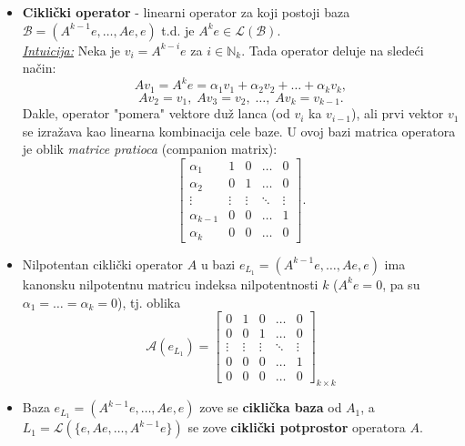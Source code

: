\documentclass[a4paper,12pt,twoside]{report}
\numberwithin{algorithm}{section}
\begin{document}
\begin{itemize}
    \item \textbf{Ciklički operator} - linearni operator za koji postoji baza $\mathcal{B} = (A^{k-1}e, \dots, Ae, e)$ t.d. je $A^ke \in \mathcal{L}(\mathcal{B})$. \\
    
    \noindent\underline{\textit{Intuicija:}} Neka je $v_i = A^{k-i}e$ za $i \in \mathbb{N}_k$. 
Tada operator deluje na sledeći način:
\[
A v_1 = A^k e = \alpha_1 v_1 + \alpha_2 v_2 + \dots + \alpha_k v_k,
\]
\[
A v_2 = v_1, \; A v_3 = v_2,\; \dots,  \;A v_k = v_{k-1}.
\]
Dakle, operator "pomera" vektore duž lanca (od $v_i$ ka $v_{i-1}$), ali prvi vektor $v_1$ se  izražava kao linearna kombinacija cele baze. 
U ovoj bazi matrica operatora je oblik \textit{matrice pratioca} (companion matrix):
\[
\begin{bmatrix}
\alpha_1 & 1 & 0 & \dots & 0 \\
\alpha_2 & 0 & 1 & \dots & 0 \\
\vdots & \vdots & \vdots & \ddots & \vdots \\
\alpha_{k-1} & 0 & 0 & \dots & 1 \\
\alpha_k & 0 & 0 & \dots & 0
\end{bmatrix}.
\]
    \item Nilpotentan ciklički operator $A$ u bazi $e_{L_1} = (A^{k-1}e, \dots, Ae, e)$ ima kanonsku nilpotentnu matricu indeksa nilpotentnosti $k$ ($A^k e = 0$, pa su $\alpha_1 = \dots = \alpha_k = 0$), tj. oblika
    \[ \mathcal{A}(e_{L_1}) = \begin{bmatrix}
        0 & 1 & 0 & \dots & 0 \\
        0 & 0 & 1 & \dots & 0 \\
        \vdots & \vdots & \vdots & \ddots & \vdots \\
        0 & 0 & 0 & \dots & 1 \\
        0 & 0 & 0 & \dots & 0
    \end{bmatrix}_{k \times k} \]
    \item Baza $e_{L_1} = (A^{k-1}e, \dots, Ae, e)$  zove se \textbf{ciklička baza} od $A_1$, a $L_1 = \mathcal{L}(\{e, Ae, \dots, A^{k-1}e\})$ se zove 
    \textbf{ciklički potprostor} operatora $A$.
\end{itemize}
\newpage
\end{document}
